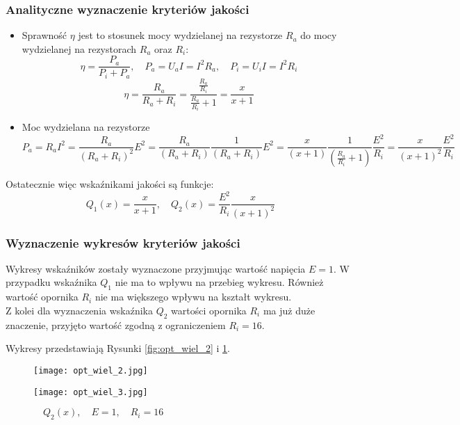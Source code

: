 \documentclass[a4paper,15pt]{article}
\begin{document}
\subsubsection{Analityczne wyznaczenie kryteriów jakości}
\begin{itemize}
\item Sprawność \( \eta \) jest to stosunek mocy wydzielanej na rezystorze \(R_{a}\) do mocy wydzielanej na rezystorach \(R_{a}\) oraz \(R_{i}\): \\
\begin{equation*}
\eta = \frac{P_{a}}{P_{i}+P_{a}}, \quad P_{a} = U_{a}I = I^{2}R_{a}, \quad P_{i} = U_{i}I = I^{2}R_{i}
\end{equation*}
\begin{equation*}
\eta = \frac{R_{a}}{R_{a}+R_{i}} = \frac{ \frac{R_{a}}{R_{i}} } {  \frac{R_{a}}{ R_{i} }  + 1 } = \frac{x}{x+1} 
\end{equation*}
\item Moc wydzielana na rezystorze 
\begin{equation*}
P_{a} = R_{a}I^{2} = \frac{R_{a}}{(R_{a}+R_{i})^{2}}E^{2} = \frac{R_{a}}{(R_{a}+R_{i})}\frac{1}{(R_{a}+R_{i})}E^{2}=\frac{x}{(x+1)}\frac{1}{(\frac{R_{a}}{R_{i}}+1)}\frac{E^{2}}{R_{i}}=\frac{x}{(x+1)^{2}}\frac{E^{2}}{R_{i}}
\end{equation*}
\end{itemize}
Ostatecznie więc wskaźnikami jakości są funkcje:
\begin{equation*}
Q_{1}(x) = \frac{x}{x+1}, \quad Q_{2}(x) = \frac{E^{2}}{R_{i}}\frac{x}{(x+1)^{2}}
\end{equation*}
\subsubsection{Wyznaczenie wykresów kryteriów jakości}
Wykresy wskaźników zostały wyznaczone przyjmując wartość napięcia \( E = 1 \). W przypadku wskaźnika \(Q_{1}\) nie ma to wpływu na przebieg wykresu. Również wartość opornika \(R_{i}\) nie ma większego wpływu na kształt wykresu.\\
Z kolei dla wyznaczenia wskaźnika \(Q_{2}\) wartości opornika \(R_{i}\) ma już duże znaczenie, przyjęto wartość zgodną z ograniczeniem \(R_{i}=16\).

Wykresy przedstawiają Rysunki \ref{fig:opt_wiel_2} i \ref{fig:opt_wiel_3}.

\begin{figure}[H]


  \texttt{[image: opt\_wiel\_2.jpg]}
  \caption{\(\quad Q_{1}(x), \quad E = 1, \quad R_{i}=16 \)}
  \label{fig:opt_wiel_2}

\endminipage\hfill
{}%

  \texttt{[image: opt\_wiel\_3.jpg]}
  \caption{\( \quad Q_{2}(x), \quad E = 1, \quad R_{i}=16\)}
  \label{fig:opt_wiel_3}

\endminipage

\end{figure}
\end{document}
